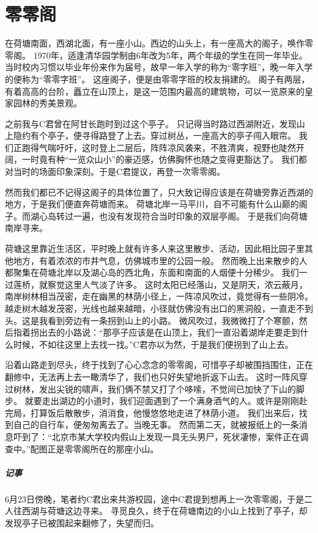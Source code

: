 \chapter{零零阁}

在荷塘南面，西湖北面，有一座小山。西边的山头上，有一座高大的阁子，唤作零零阁。%
1970年，适逢清华园学制由6年改为5年，两个年级的学生在同一年毕业。
当时校内习惯以毕业年份来作为届号，故早一年入学的称为“零字班”，晚一年入学的便称为“零零字班”。
这座阁子，便是由零零字班的校友捐建的。
阁子有两层，有着高高的台阶，矗立在山顶上，是这一范围内最高的建筑物，可以一览原来的皇家园林的秀美景观。

之前我与C君曾在阿甘长跑时到过这个亭子。
只记得当时路过西湖附近，发现山上隐约有个亭子，便寻得路登了上去。穿过树丛，一座高大的亭子闯入眼帘。
我们正跑得气喘吁吁，这时登上二层后，阵阵凉风袭来，不胜清爽，视野也陡然开阔，一时竟有种“一览众山小”的豪迈感，仿佛胸怀也随之变得更豁达了。
我们都对当时的场面印象深刻。于是C君提议，再登一次零零阁。

然而我们都已不记得这阁子的具体位置了，只大致记得应该是在荷塘旁靠近西湖的地方，于是我们便直奔荷塘而来。
荷塘北岸一马平川，自不可能有什么山巅的阁子。而湖心岛转过一遍，也没有发现符合当时印象的双层亭阁。
于是我们向荷塘南岸寻来。

荷塘这里靠近生活区，平时晚上就有许多人来这里散步、活动，因此相比园子里其他地方，有着浓浓的市井气息，仿佛城市里的公园一般。
然而晚上出来散步的人都聚集在荷塘北岸以及湖心岛的西北角，东面和南面的人烟便十分稀少。
我们一过莲桥，就察觉这里人气淡了许多。
这时太阳已经落山，又是阴天，浓云蔽月，南岸树林相当茂密，走在幽黑的林荫小径上，一阵凉风吹过，竟觉得有一些阴冷。
越走树木越发茂密，光线也越来越暗，小径就仿佛没有出口的黑洞般，一直走不到头。这是我看到旁边有一条拐到山上的小路。
微风吹过，我微微打了个寒颤，然后指着拐出去的小路说：“那亭子应该是在山顶上，我们一直沿着湖岸走要走到什么时候，不如往这里上去找一找。”C君亦以为然，于是我们便拐到了山上去。

沿着山路走到尽头，终于找到了心心念念的零零阁，可惜亭子却被围挡围住，正在翻修中，无法再上去一瞰清华了，我们也只好失望地折返下山去。
这时一阵风穿过树林，发出尖锐的啸声，我们俩不禁又打了个哆嗦，不觉间已加快了下山的脚步。
就要走出湖边的小道时，我们迎面遇到了一个满身酒气的人。或许是刚刚赴完局，打算饭后散散步，消消食，他慢悠悠地走进了林荫小道。
我们出来后，找到自己的自行车，便匆匆离去了。当晚无事。
然而第二天，就被报纸上的一条消息吓到了：“北京市某大学校内假山上发现一具无头男尸，死状凄惨，案件正在调查中。”配图正是零零阁所在的那座小山。

\vfill

\paragraph{记事}
6月23日傍晚，笔者约C君出来共游校园，途中C君提到想再上一次零零阁，于是二人往西湖与荷塘这边寻来。
寻觅良久，终于在荷塘南边的小山上找到了亭子，却发现亭子已被围起来翻修了，失望而归。
